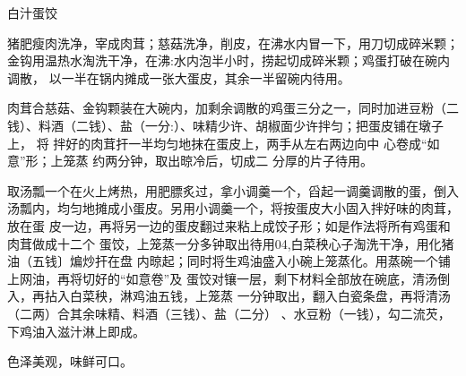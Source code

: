 \begin{recipe}[如意蛋饺]{白汁蛋饺}

\ingredients


\cooking

\step 猪肥瘦肉洗净，宰成肉茸；慈菇洗净，削皮，在沸水内冒一下，用刀切成碎米颗；
金钩用温热水淘洗干净，在沸:水内泡半小时，捞起切成碎米颗；鸡蛋打破在碗内调散，
以一半在锅内摊成一张大蛋皮，其余一半留碗内待用。

\step 肉茸合慈菇、金钩颗装在大碗内，加剩余调散的鸡蛋三分之一，同时加进豆粉（二
钱）、料酒（二钱）、盐（一分:）、味精少许、胡椒面少许拌匀；把蛋皮铺在墩子上，
将 拌好的肉茸扞一半均匀地抹在蛋皮上，两手从左右两边向中 心卷成“如意”形；上笼蒸
约两分钟，取出晾冷后，切成二 分厚的片子待用。

\step 取汤瓢一个在火上烤热，用肥膘炙过，拿小调羹一个，舀起一调羹调散的蛋，倒入
汤瓢内，均匀地摊成小蛋皮。另用小调羹一个，将按蛋皮大小固入拌好味的肉茸，放在蛋
皮一边，再将另一边的蛋皮翻过来粘上成饺子形；如是作法将所有鸡蛋和肉茸做成十二个
蛋饺，上笼蒸一分多钟取出待用04,白菜秧心子淘洗干净，用化猪油（五钱〕煸炒扞在盘
内晾起；同时将生鸡油盛入小碗上笼蒸化。用蒸碗一个铺上网油，再将切好的“如意卷”及
蛋饺对镶一层，剩下材料全部放在碗底，清汤倒入，再拈入白菜秧，淋鸡油五钱，上笼蒸
一分钟取出，翻入白瓷条盘，再将清汤（二两）合其余味精、料酒（三钱）、盐（二分）
、水豆粉（一钱），勾二流芡，下鸡油入滋汁淋上即成。

\notes

色泽美观，味鲜可口。

\end{recipe}

